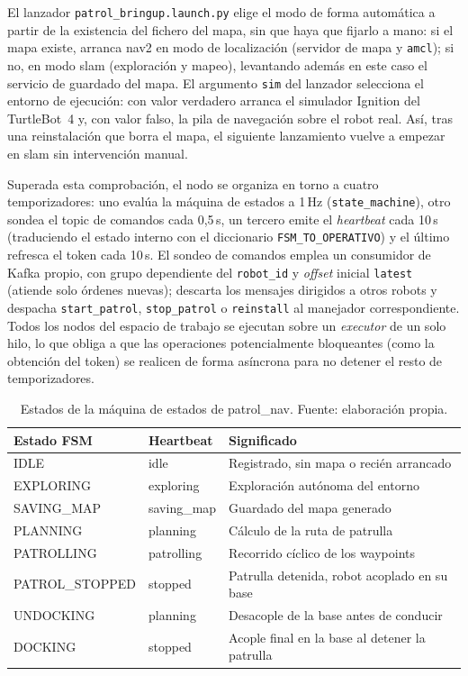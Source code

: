 El lanzador \texttt{patrol\_bringup\allowbreak.launch\allowbreak.py} elige el modo de
forma automática a partir de la existencia del fichero del mapa, sin que haya que
fijarlo a mano: si el mapa existe, arranca \gls{nav2} en modo de localización (servidor
de mapa y \texttt{amcl}); si no, en modo \gls{slam} (exploración y mapeo), levantando
además en este caso el servicio de guardado del mapa. El argumento \texttt{sim} del
lanzador selecciona el entorno de ejecución: con valor verdadero arranca el simulador
Ignition del TurtleBot~4 y, con valor falso, la pila de navegación sobre el robot real.
Así, tras una reinstalación que borra el mapa, el siguiente lanzamiento vuelve a empezar
en \gls{slam} sin intervención manual.

Superada esta comprobación, el nodo se organiza en
torno a cuatro temporizadores: uno evalúa la máquina de estados a 1\,Hz (\texttt{state\_machine}),
otro sondea el topic de comandos cada 0,5\,s, un tercero emite el \textit{heartbeat}
cada 10\,s (traduciendo el estado interno con el diccionario
\texttt{FSM\_TO\_OPERATIVO}) y el último refresca el token cada 10\,s. El sondeo de
comandos emplea un consumidor de Kafka propio, con grupo dependiente del
\texttt{robot\_id} y \textit{offset} inicial \texttt{latest} (atiende solo órdenes
nuevas); descarta los mensajes dirigidos a otros robots y despacha \texttt{start\_patrol},
\texttt{stop\_patrol} o \texttt{reinstall} al manejador correspondiente. Todos los nodos
del espacio de trabajo se ejecutan sobre un \textit{executor} de un solo hilo, lo que
obliga a que las operaciones potencialmente bloqueantes (como la obtención del token)
se realicen de forma asíncrona para no detener el resto de temporizadores.

\begin{table}[htbp]
  \centering
  \small
  \caption{Estados de la máquina de estados de patrol\_nav. Fuente: elaboración propia.}
  \label{tab:estados-fsm}
  \begin{tabular}{@{}>{\ttfamily}l >{\ttfamily}l
                     >{\raggedright\arraybackslash}p{6.5cm}@{}}
    \toprule
    \textbf{\normalfont Estado FSM} & \textbf{\normalfont Heartbeat} &
    \textbf{Significado} \\
    \midrule
    IDLE           & idle        & Registrado, sin mapa o recién arrancado \\
    EXPLORING      & exploring   & Exploración autónoma del entorno \\
    SAVING\_MAP    & saving\_map & Guardado del mapa generado \\
    PLANNING       & planning    & Cálculo de la ruta de patrulla \\
    PATROLLING     & patrolling  & Recorrido cíclico de los waypoints \\
    PATROL\_STOPPED & stopped    & Patrulla detenida, robot acoplado en su base \\
    UNDOCKING      & planning    & Desacople de la base antes de conducir \\
    DOCKING        & stopped     & Acople final en la base al detener la patrulla \\
    \bottomrule
  \end{tabular}
\end{table}

